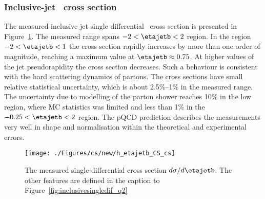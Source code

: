 \subsubsection*{Inclusive-jet \dsdetajetb~cross section}
The measured inclusive-jet single differential \dsdetajetb~cross section is presented in Figure~\ref{fig:inclusivesingledif_eta}. The measured range spans $-2 < \etajetb < 2$ region. In the region  $-2 < \etajetb < 1$ the cross section rapidly increases by more than one order of magnitude, reaching a maximum value at $\etajetb \approx 0.75$. At higher values of the jet pseudorapidity the cross section decreases. Such a behaviour is consistent with the hard scattering dynamics of partons. The cross sections have small relative statistical uncertainty, which is about 2.5\%--1\% in the measured range. %
The uncertainty due to modelling of the parton shower reaches 10\% in the low \etajetb region, where MC statistics was limited and less than 1\% in the $-0.25 < \etajetb < 2$ region. The pQCD prediction describes the measurements very well in shape and normalisation within the theoretical and experimental errors.
\begin{figure}[p]
	\centering
		\texttt{[image: ./Figures/cs/new/h\_etajetb\_CS\_cs]}
	\caption{The measured single-differential cross section $d\sigma/d\etajetb$. The other features are defined in the caption to Figure~\ref{fig:inclusivesingledif_q2}}
	\label{fig:inclusivesingledif_eta}
\end{figure}

